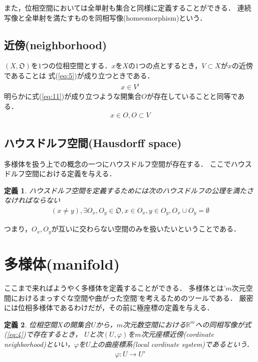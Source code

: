 \documentclass[11pt,a4j]{jarticle}
\newtheorem{dfn}{定義}
\begin{document}
また，位相空間においては全単射も集合と同様に定義することができる．
連続写像と全単射を満たすものを同相写像(homeomorphism)という．

\subsection{近傍(neighborhood)}
$(X,\mathfrak{O})$を$1$つの位相空間とする．$x$を$X$の$1$つの点とするとき，$V \subset X$が$x$の近傍であることは
式(\ref{eq:5})が成り立つときである．
\begin{eqnarray}
    \label{eq:5}
    x \in V^i
\end{eqnarray}
明らかに式(\ref{eq:11})が成り立つような開集合$O$が存在していることと同等である．
\begin{eqnarray} 
    \label{eq:11}
    x \in O,O \subset V
\end{eqnarray}


\subsection{ハウスドルフ空間(Hausdorff space)}
多様体を扱う上での概念の一つにハウスドルフ空間が存在する．
ここでハウスドルフ空間における定義を与える．

\begin{dfn}
    \label{dfn:9}
    ハウスドルフ空間を定義するためには次のハウスドルフの公理を満たさなければならない
    \begin{eqnarray}
        (x \not = y),\exists O_x,O_y \in \mathfrak{O},x \in O_x,y \in O_y ,O_x \cup O_y = \emptyset
    \end{eqnarray}
\end{dfn}

つまり，$O_x,O_y$が互いに交わらない空間のみを扱いたいということである．

\section{多様体(manifold)}
ここまで来ればようやく多様体を定義することができる．
多様体とは'$m$次元空間におけるまっすぐな空間や曲がった空間’を考えるためのツールである．
厳密には位相多様体であるわけだが，その前に極座標の定義を与える．
\begin{dfn}
    \label{dfn:10}
    位相空間$X$の開集合$U$から，$m$次元数空間における$\mathbb{R}^m$への同相写像が式(\ref{eq:4})で存在するとき，
    $U$と次$(U,\varphi)$を$m$次元座標近傍(cordinate neighborhood)といい，$\varphi$を$U$上の曲座標系(local cordinate system)であるという．
    \begin{eqnarray}
        \label{eq:4}
        \varphi:U \rightarrow U'
    \end{eqnarray}
\end{dfn}
\end{document}
